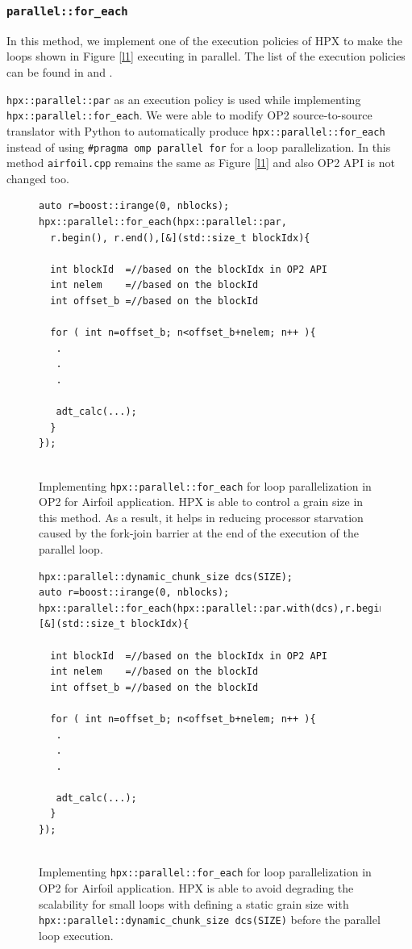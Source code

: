 \documentclass[conference]{IEEEtran}
\begin{document}
\subsubsection{\textbf{\texttt{parallel::for\_each}}}
\label{sec:for}

In this method, we implement one of the execution policies of HPX to make the loops shown in Figure \ref{l1} executing in parallel. The list of the execution policies can be found in \cite{p1} and \cite{hpx_v0.9.11}. 

\texttt{hpx::parallel::par} as an execution policy is used while implementing \texttt{hpx::parallel::for\_each}. We were able to modify OP2 source-to-source translator with Python to automatically produce \texttt{hpx::parallel::for\_each} instead of using \texttt{\#pragma omp parallel for} for a loop parallelization. In this method \texttt{airfoil.cpp} remains the same as Figure \ref{l1} and also OP2 API is not changed too.

\begin{figure} 
    \begin{lstlisting}    
auto r=boost::irange(0, nblocks);
hpx::parallel::for_each(hpx::parallel::par,
  r.begin(), r.end(),[&](std::size_t blockIdx){
  
  int blockId  =//based on the blockIdx in OP2 API
  int nelem    =//based on the blockId 
  int offset_b =//based on the blockId
        
  for ( int n=offset_b; n<offset_b+nelem; n++ ){
   .
   .
   .

   adt_calc(...);
  }
});
  
    \end{lstlisting}
    \caption{\small{Implementing \texttt{hpx::parallel::for\_each} for loop parallelization in OP2 for Airfoil application. HPX is able to control a grain size in this method. As a result, it helps in reducing processor starvation caused by the fork-join barrier at the end of the execution of the parallel loop.}}
    \label{l3}
\end{figure}

\begin{figure} 
    \begin{lstlisting}    
hpx::parallel::dynamic_chunk_size dcs(SIZE);
auto r=boost::irange(0, nblocks);
hpx::parallel::for_each(hpx::parallel::par.with(dcs),r.begin(),r.end(),[&](std::size_t blockIdx){
  
  int blockId  =//based on the blockIdx in OP2 API
  int nelem    =//based on the blockId 
  int offset_b =//based on the blockId
        
  for ( int n=offset_b; n<offset_b+nelem; n++ ){
   .
   .
   .

   adt_calc(...);
  }
});
  
    \end{lstlisting}
    \caption{\small{Implementing \texttt{hpx::parallel::for\_each} for loop parallelization in OP2 for Airfoil application. HPX is able to avoid degrading the scalability for small loops with defining a static grain size with \texttt{hpx::parallel::dynamic\_chunk\_size dcs(SIZE)} before the parallel loop execution.}}
    \label{l3b}
\end{figure}
\end{document}
